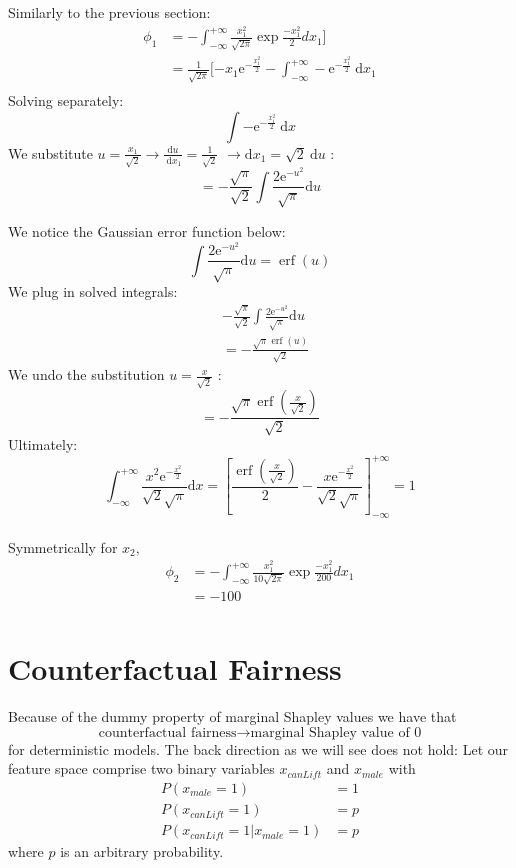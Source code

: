 Similarly to the previous section:
\begin{align*}
    \phi_1 & = - \int_{-\infty}^{+\infty} \frac{x_{1}^2}{\sqrt{2\pi}} \exp{\frac{-x_{1}^2}2} d x_1 ] \\
    & =\frac{1}{\sqrt{2\pi}}[-x_{1} \mathrm{e}^{-\frac{x_{1}^{2}}{2}}-\int_{-\infty}^{+\infty}-\mathrm{e}^{-\frac{x_{1}^{2}}{2}} \mathrm{~d} x_1 \\
\end{align*}
Solving separately:
$$
\int-\mathrm{e}^{-\frac{x_1^{2}}{2}} \mathrm{~d} x
$$
We substitute $u=\frac{x_1}{\sqrt{2}} \longrightarrow \frac{\mathrm{d} u}{\mathrm{~d} x_1}=\frac{1}{\sqrt{2}}$ $\longrightarrow \mathrm{d} x_1=\sqrt{2} \mathrm{~d} u$ :
$$
=-\frac{\sqrt{\pi}}{\sqrt{2}} \int \frac{2 \mathrm{e}^{-u^{2}}}{\sqrt{\pi}} \mathrm{d} u
$$

We notice the Gaussian error function below: 
$$
\int \frac{2 \mathrm{e}^{-u^{2}}}{\sqrt{\pi}} \mathrm{d} u =\operatorname{erf}(u)
$$
We plug in solved integrals:
$$
\begin{aligned}
&-\frac{\sqrt{\pi}}{\sqrt{2}} \int \frac{2 \mathrm{e}^{-u^{2}}}{\sqrt{\pi}} \mathrm{d} u \\
&=-\frac{\sqrt{\pi} \operatorname{erf}(u)}{\sqrt{2}}
\end{aligned}
$$
We undo the substitution $u=\frac{x}{\sqrt{2}}$ :
$$
=-\frac{\sqrt{\pi} \operatorname{erf}\left(\frac{x}{\sqrt{2}}\right)}{\sqrt{2}}
$$
Ultimately: 
$$
\int_{-\infty}^{+\infty} \frac{x^{2} \mathrm{e}^{-\frac{x^{2}}{2}}}{\sqrt{2} \sqrt{\pi}} \mathrm{d} x =[\frac{\operatorname{erf}\left(\frac{x}{\sqrt{2}}\right)}{2}-\frac{x \mathrm{e}^{-\frac{x^{2}}{2}}}{\sqrt{2} \sqrt{\pi}}]_{-\infty}^{+\infty}=1 
$$\\
Symmetrically for $x_2$,
\begin{align*}
    \phi_2 & = - \int_{-\infty}^{+\infty} \frac{x_{1}^2}{10\sqrt{2\pi}} \exp{\frac{-x_{1}^2}{200}} d x_1 \\
    & = -100\\
\end{align*}

\section{Counterfactual Fairness} \label{sec:suppl_marg_fairness}
Because of the dummy property of marginal Shapley values we have that 
$$ \text{counterfactual fairness} \rightarrow \text{marginal Shapley value of 0}$$
for deterministic models. 
The back direction as we will see does not hold: 
Let our feature space comprise two binary variables $x_{canLift}$ and $x_{male}$ with 
\begin{align*}
    P(x_{male}=1) &= 1 \\
    P(x_{canLift}=1) &= p\\
    P(x_{canLift}=1|x_{male}=1) &= p
\end{align*}
where $p$ is an arbitrary probability.

